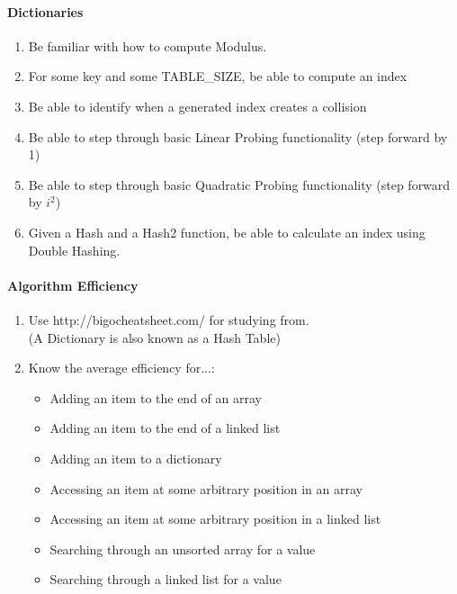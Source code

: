 \documentclass[a4paper,12pt]{book}
\begin{document}
    \paragraph{Dictionaries}

    \begin{enumerate}
        \item   Be familiar with how to compute Modulus.
        \item   For some key and some TABLE\_SIZE, be able to compute an index
        \item   Be able to identify when a generated index creates a collision
        \item   Be able to step through basic Linear Probing functionality (step forward by 1)
        \item   Be able to step through basic Quadratic Probing functionality (step forward by $i^{2}$)
        \item   Given a Hash and a Hash2 function, be able to calculate an index using Double Hashing.
    \end{enumerate}

    \paragraph{Algorithm Efficiency}

    \begin{enumerate}
        \item   Use http://bigocheatsheet.com/ for studying from.   \\
                (A Dictionary is also known as a Hash Table)
        \item   Know the average efficiency for...:
        \begin{itemize}
            \item   Adding an item to the end of an array
            \item   Adding an item to the end of a linked list
            \item   Adding an item to a dictionary
            \item   Accessing an item at some arbitrary position in an array
            \item   Accessing an item at some arbitrary position in a linked list
            \item   Searching through an unsorted array for a value
            \item   Searching through a linked list for a value
        \end{itemize}
    \end{enumerate}
\end{document}
